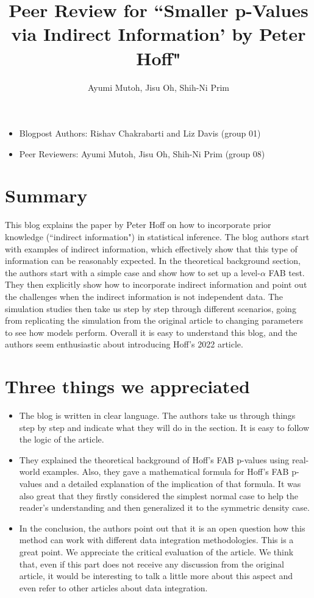 \documentclass[11pt]{article}
\title{Peer Review for ``Smaller p-Values via Indirect Information' by Peter Hoff"}
\author{Ayumi Mutoh, Jisu Oh, Shih-Ni Prim}
\begin{document}
\maketitle

\begin{itemize}
    \item Blogpost Authors: Rishav Chakrabarti and Liz Davis (group 01)
    \item Peer Reviewers: Ayumi Mutoh, Jisu Oh, Shih-Ni Prim (group 08)
\end{itemize}

\section{Summary}

This blog explains the paper by Peter Hoff on how to incorporate prior knowledge (``indirect information") in statistical inference. The blog authors start with examples of indirect information, which effectively show that this type of information can be reasonably expected. In the theoretical background section, the authors start with a simple case and show how to set up a level-$\alpha$ FAB test. They then explicitly show how to incorporate indirect information and point out the challenges when the indirect information is not independent data. The simulation studies then take us step by step through different scenarios, going from replicating the simulation from the original article to changing parameters to see how models perform. Overall it is easy to understand this blog, and the authors seem enthusiastic about introducing Hoff's 2022 article.

\section{Three things we appreciated}

\begin{itemize}
    \item The blog is written in clear language. The authors take us through things step by step and indicate what they will do in the section. It is easy to follow the logic of the article.
    \item They explained the theoretical background of Hoff's FAB p-values using real-world examples. Also, they gave a mathematical formula for Hoff's FAB p-values and a detailed explanation of the implication of that formula.
    It was also great that they firstly considered the simplest normal case to help the reader's understanding and then generalized it to the symmetric density case.
    \item In the conclusion, the authors point out that it is an open question how this method can work with different data integration methodologies. This is a great point. We appreciate the critical evaluation of the article. We think that, even if this part does not receive any discussion from the original article, it would be interesting to talk a little more about this aspect and even refer to other articles about data integration.
\end{itemize}
\end{document}

